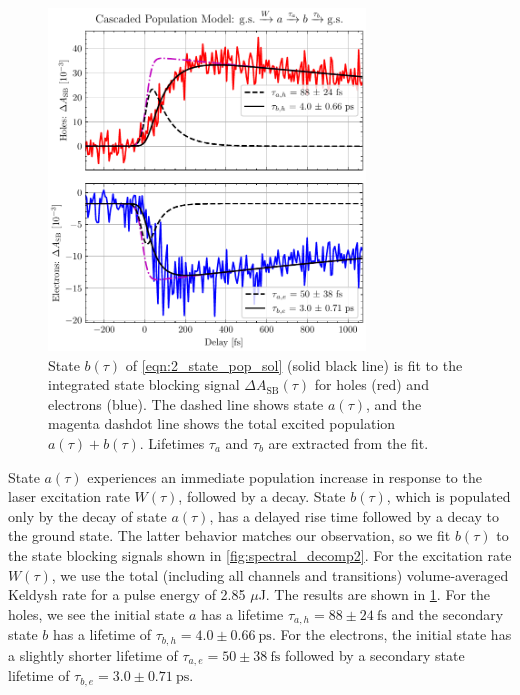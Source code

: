 \begin{figure}
	\centering
	\includegraphics[width=0.75\textwidth]{figures/chap4/SB_eh_2state_model.pdf}
	\caption{State $b(\tau)$ of \cref{eqn:2_state_pop_sol} (solid black line) is fit to the integrated state blocking signal $\Delta A_{\textrm{SB}}(\tau)$ for holes (red) and electrons (blue). The dashed line shows state $a(\tau)$, and the magenta dashdot line shows the total excited population $a(\tau)+b(\tau)$. Lifetimes $\tau_a$ and $\tau_b$ are extracted from the fit.}
	\label{fig:SB_eh_2state_model}
\end{figure}


State $a(\tau)$ experiences an immediate population increase in response to the laser excitation rate $W(\tau)$, followed by a decay. State $b(\tau)$, which is populated only by the decay of state $a(\tau)$, has a delayed rise time followed by a decay to the ground state. The latter behavior matches our observation, so we fit $b(\tau)$ to the state blocking signals shown in \cref{fig:spectral_decomp2}. For the excitation rate $W(\tau)$, we use the total (including all channels and transitions) volume-averaged Keldysh rate for a pulse energy of 2.85 $\mu$J. The results are shown in \cref{fig:SB_eh_2state_model}. For the holes, we see the initial state $a$ has a lifetime $\tau_{a,h} = 88 \pm 24 \ \textrm{fs}$ and the secondary state $b$ has a lifetime of $\tau_{b,h} = 4.0 \pm 0.66 \ \textrm{ps}$. For the electrons, the initial state has a slightly shorter lifetime of ${\tau_{a,e} = 50 \pm 38 \ \textrm{fs}}$ followed by a secondary state lifetime of ${\tau_{b,e} = 3.0 \pm 0.71 \ \textrm{ps}}$.

